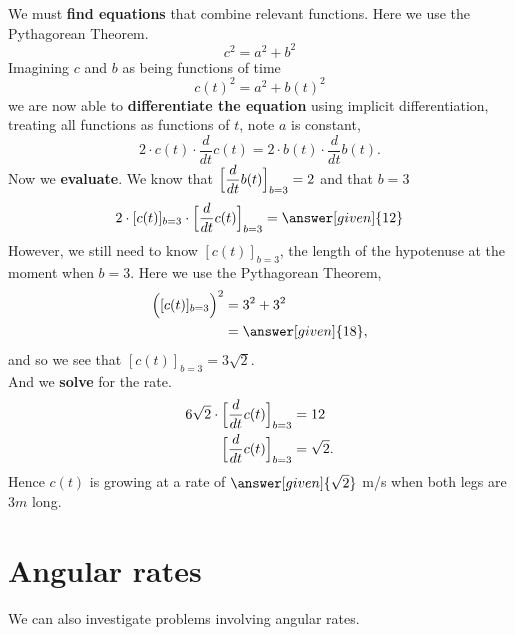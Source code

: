 \documentclass{ximera}
\begin{document}
\begin{example}
\begin{explanation}
    We must \textbf{find equations} that combine relevant
    functions. Here we use the Pythagorean Theorem.
    \[
    c^2 = a^2 + b^2
    \]
    Imagining $c$ and $b$ as being functions of time
    \[
    c(t)^2 = a^2 + b(t)^2
    \]
    we are now able to \textbf{differentiate the equation} using
    implicit differentiation, treating all functions as functions of
    $t$, note $a$ is constant,
    \[
    2\cdot c(t)\cdot \dfrac{d}{dt}c(t) = 2\cdot b(t)\cdot \dfrac{d}{dt}b(t).
    \]
    Now we \textbf{evaluate}. We
    know that $\Bigl[\dfrac{d}{dt}b(t)\Bigr]_{b=3} = 2$ and that $b = 3$
    \[
    2\cdot [c(t)]_{b=3}\cdot \Bigl[\dfrac{d}{dt}c(t)\Bigr]_{b=3} = \answer[given]{12}
    \]
    However, we still need to know $[c(t)]_{b=3}$, the length of the hypotenuse at the moment when $b=3$. Here we use
    the Pythagorean Theorem,
    \begin{align*}
    \Bigl([c(t)]_{b=3}\Bigr)^2 &= 3^2 + 3^2\\
    &=\answer[given]{18},
    \end{align*}
    and so we see that $[c(t)]_{b=3} = 3\sqrt{2}$. \\
    And we \textbf{solve} for the rate.\\
    \begin{align*}
      6\sqrt{2}\cdot \Bigl[\dfrac{d}{dt}c(t)\Bigr]_{b=3} &= 12 \\     
      \Bigl[\dfrac{d}{dt}c(t)\Bigr]_{b=3} &= \sqrt{2}.
    \end{align*}
    Hence $c(t)$ is growing at a rate of $\answer[given]{\sqrt{2}}$ m/s when both legs are $3m$ long.
  \end{explanation}
\end{example}


\section{Angular rates}


We can also investigate problems involving angular rates.
\end{document}
